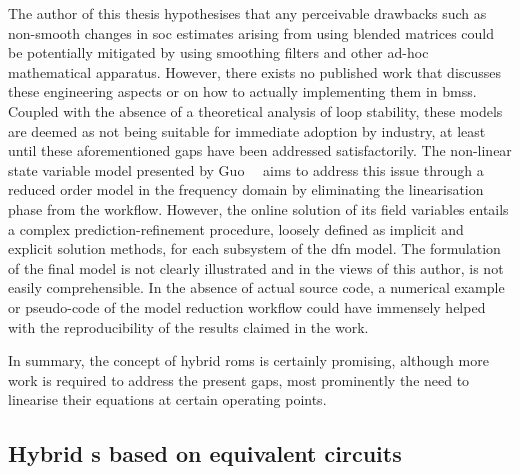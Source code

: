 The  author of  this thesis  hypothesises  that any  perceivable drawbacks  such
as  non-smooth  changes  in  \gls{soc}  estimates  arising  from  using  blended
matrices could  be potentially  mitigated by using  smoothing filters  and other
ad-hoc  mathematical apparatus.  However, there  exists no  published work  that
discusses these engineering  aspects or on how to actually  implementing them in
\glspl{bms}.  Coupled  with  the  absence  of a  theoretical  analysis  of  loop
stability,  these  models  are  deemed  as  not  being  suitable  for  immediate
adoption  by  industry, at  least  until  these  aforementioned gaps  have  been
addressed  satisfactorily.  The non-linear  state  variable  model presented  by
Guo~\etal{}~\cite{Guo2017} aims  to address this  issue through a  reduced order
model in  the frequency domain by  eliminating the linearisation phase  from the
workflow. However, the online solution of  its field variables entails a complex
prediction-refinement  procedure,  loosely  defined  as  implicit  and  explicit
solution methods, for each subsystem of  the \gls{dfn} model. The formulation of
the final model is  not clearly illustrated and in the views  of this author, is
not easily  comprehensible. In the  absence of  actual source code,  a numerical
example  or pseudo-code  of the  model reduction  workflow could  have immensely
helped with the reproducibility of the results claimed in the work.

In summary, the  concept of hybrid \glspl{rom} is  certainly promising, although
more work is required to address the  present gaps, most prominently the need to
linearise their equations at certain operating points.


\subsection{Hybrid s based on equivalent circuits}

